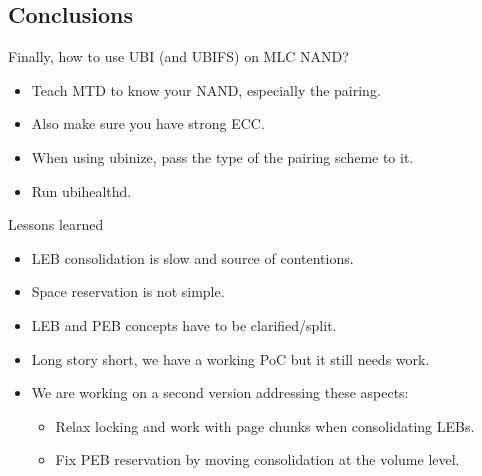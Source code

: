 \documentclass[aspectratio=169,obeyspaces,spaces,hyphens,dvipsnames]{beamer}
\begin{document}
\subsection{Conclusions}

\begin{frame}{Finally, how to use UBI (and UBIFS) on MLC NAND?}
  \begin{itemize}
  \item Teach MTD to know your NAND, especially the pairing.
  \item Also make sure you have strong ECC.
  \item When using ubinize, pass the type of the pairing scheme to it.
  \item Run ubihealthd.
  \end{itemize}
\end{frame}

\begin{frame}{Lessons learned}
  \begin{itemize}
  \item LEB consolidation is slow and source of contentions.
  \item Space reservation is not simple.
  \item LEB and PEB concepts have to be clarified/split.
  \item Long story short, we have a working PoC but it still needs work.
  \item We are working on a second version addressing these aspects:
    \begin{itemize}
    \item Relax locking and work with page chunks when consolidating LEBs.
    \item Fix PEB reservation by moving consolidation at the volume level.
    \end{itemize}
  \end{itemize}
\end{frame}
\end{document}
